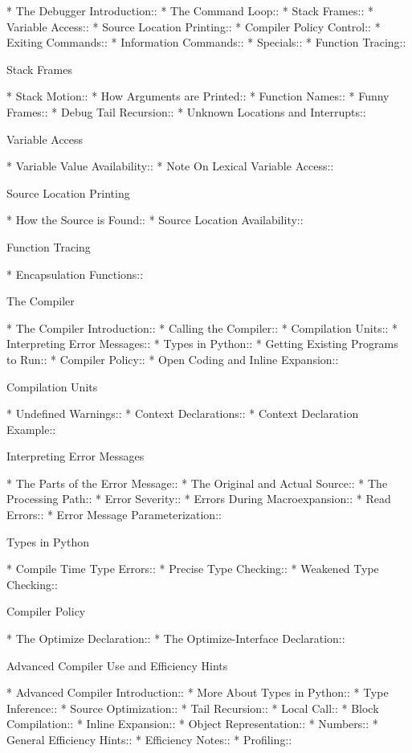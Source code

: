 \begin{menu}
* The Debugger Introduction::   
* The Command Loop::            
* Stack Frames::                
* Variable Access::             
* Source Location Printing::    
* Compiler Policy Control::     
* Exiting Commands::            
* Information Commands::        
* Specials::                    
* Function Tracing::            

Stack Frames

* Stack Motion::                
* How Arguments are Printed::   
* Function Names::              
* Funny Frames::                
* Debug Tail Recursion::        
* Unknown Locations and Interrupts::  

Variable Access

* Variable Value Availability::  
* Note On Lexical Variable Access::  

Source Location Printing

* How the Source is Found::     
* Source Location Availability::  

Function Tracing

* Encapsulation Functions::     

The Compiler

* The Compiler Introduction::   
* Calling the Compiler::        
* Compilation Units::           
* Interpreting Error Messages::  
* Types in Python::             
* Getting Existing Programs to Run::  
* Compiler Policy::             
* Open Coding and Inline Expansion::  

Compilation Units

* Undefined Warnings::          
* Context Declarations::        
* Context Declaration Example::  

Interpreting Error Messages

* The Parts of the Error Message::  
* The Original and Actual Source::  
* The Processing Path::         
* Error Severity::              
* Errors During Macroexpansion::  
* Read Errors::                 
* Error Message Parameterization::  

Types in Python

* Compile Time Type Errors::    
* Precise Type Checking::       
* Weakened Type Checking::      

Compiler Policy

* The Optimize Declaration::    
* The Optimize-Interface Declaration::  

Advanced Compiler Use and Efficiency Hints

* Advanced Compiler Introduction::  
* More About Types in Python::  
* Type Inference::              
* Source Optimization::         
* Tail Recursion::              
* Local Call::                  
* Block Compilation::           
* Inline Expansion::            
* Object Representation::       
* Numbers::                     
* General Efficiency Hints::    
* Efficiency Notes::            
* Profiling::                   


\end{menu}
